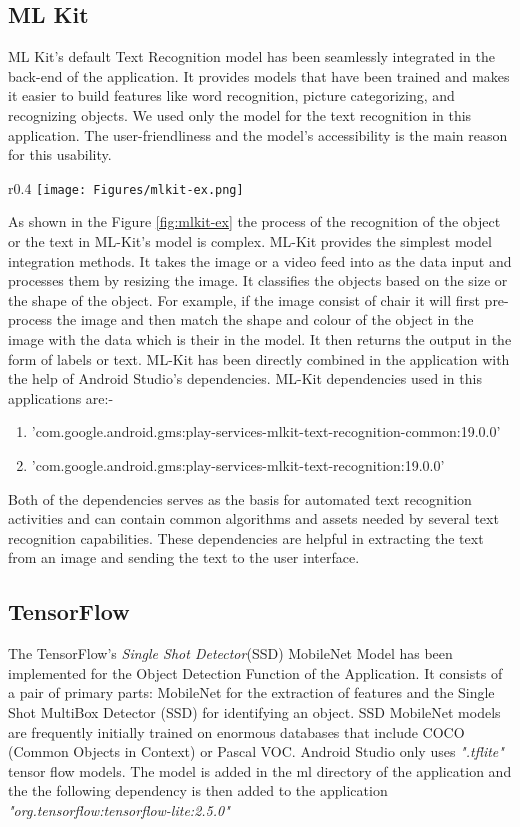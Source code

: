 \documentclass[MScCS]{uccthesis}
\begin{document}
\subsection{ML Kit}
ML Kit's default Text Recognition model has been seamlessly integrated in the back-end of the application. It provides models that have been trained and makes it easier to build features like word recognition, picture categorizing, and recognizing objects. We used only the model for the text recognition in this application. The user-friendliness and the model's accessibility is the main reason for this usability. 
\begin{wrapfigure}{r}{0.4\textwidth}
\centering
    \texttt{[image: Figures/mlkit-ex.png]}
    \caption{\centering ML-KIT Recognition process}
    \label{fig:mlkit-ex}
\end{wrapfigure}
As shown in the Figure \ref{fig:mlkit-ex} the process of the recognition of the object or the text in ML-Kit's model is complex. ML-Kit provides the simplest model integration methods. It takes the image or a video feed into as the data input and processes them by resizing the image. It classifies the objects based on the size or the shape of the object. For example, if the image consist of chair it will first pre-process the image and then match the shape and colour of the object in the image with the data which is their in the model. It then returns the output in the form of labels or text. 
ML-Kit has been directly combined in the application with the help of Android Studio's dependencies. ML-Kit dependencies used in this applications are:- 
\begin{enumerate}
    \item 'com.google.android.gms:play-services-mlkit-text-recognition-common:19.0.0'
    \item 'com.google.android.gms:play-services-mlkit-text-recognition:19.0.0'

\end{enumerate}
Both of the dependencies serves as the basis for automated text recognition activities and can contain common algorithms and assets needed by several text recognition capabilities. These dependencies are helpful in extracting the text from an image and sending the text to the user interface.

\subsection{TensorFlow}

The TensorFlow's \textit{Single Shot Detector}(SSD) MobileNet Model has been implemented for the Object Detection Function of the Application. It consists of a pair of primary parts: MobileNet for the extraction of features and the Single Shot MultiBox Detector (SSD) for identifying an object. SSD MobileNet models are frequently initially trained on enormous databases that include COCO (Common Objects in Context) or Pascal VOC. Android Studio only uses \textit{".tflite"} tensor flow models. The model is added in the ml directory of the application and the the following dependency is then added to the application \textit{"org.tensorflow:tensorflow-lite:2.5.0"}\\
\end{document}
